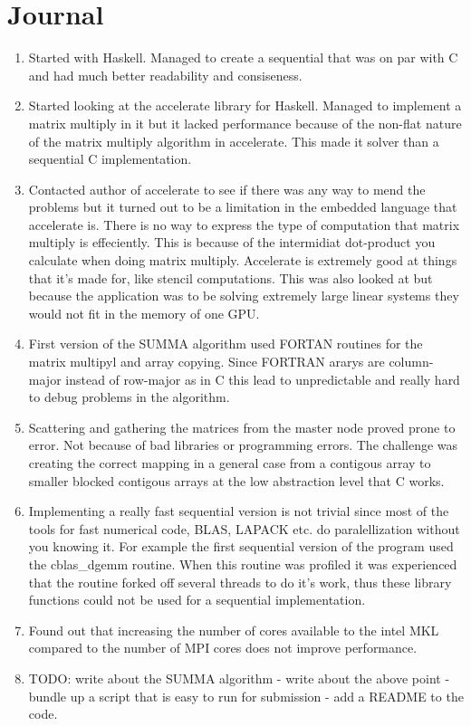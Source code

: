 \documentclass{article}
\begin{document}
\section{Journal}
\begin{enumerate}
	\item Started with Haskell. Managed to create a sequential that was on par with C and had much better readability and consiseness.
	\item Started looking at the accelerate library for Haskell. Managed to implement a matrix multiply in it but it lacked performance because of the non-flat nature of the matrix multiply algorithm in accelerate. This made it solver than a sequential C implementation.
	\item Contacted author of accelerate to see if there was any way to mend the problems but it turned out to be a limitation in the embedded language that accelerate is. There is no way to express the type of computation that matrix multiply is effeciently. This is because of the intermidiat dot-product you calculate when doing matrix multiply. Accelerate is extremely good at things that it's made for, like stencil computations. This was also looked at but because the application was to be solving extremely large linear systems they would not fit in the memory of one GPU.
	\item First version of the SUMMA algorithm used FORTAN routines for the matrix multipyl and array copying. Since FORTRAN ararys are column-major instead of row-major as in C this lead to unpredictable and really hard to debug problems in the algorithm.
	\item Scattering and gathering the matrices from the master node proved prone to error. Not because of bad libraries or programming errors. The challenge was creating the correct mapping in a general case from a contigous array to smaller blocked contigous arrays at the low abstraction level that C works.
	\item Implementing a really fast sequential version is not trivial since most of the tools for fast numerical code, BLAS, LAPACK etc. do paralellization without you knowing it. For example the first sequential version of the program used the cblas\_dgemm routine. When this routine was profiled it was experienced that the routine forked off several threads to do it's work, thus these library functions could not be used for a sequential implementation.
	\item Found out that increasing the number of cores available to the intel MKL compared to the number of MPI cores does not improve performance.
	\item TODO: write about the SUMMA algorithm - write about the above point - bundle up a script that is easy to run for submission - add a README to the code.
\end{enumerate}
\end{document}
